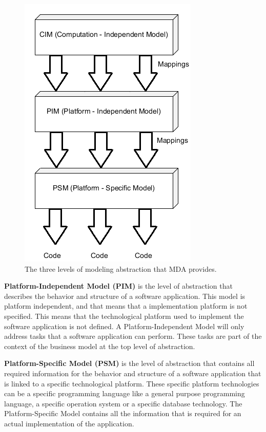 \begin{figure}[H]
	\centering
	\includegraphics[scale=0.7]{./Figures/MDA_Platforms.png}
	\caption[The three levels of modeling abstraction for MDA]
	{The three levels of modeling abstraction that MDA provides.}
	\label{fig:MDA_PLATFORM}
\end{figure}

\textbf{Platform-Independent Model (PIM)} is the level of abstraction that
describes the behavior and structure of a software application. This model is
platform independent, and that means that a implementation platform is not
specified. This means that the technological platform used to implement the
software application is not defined. A Platform-Independent Model will only
address tasks that a software application can perform. These tasks are part of
the context of the business model at the top level of abstraction.

\textbf{Platform-Specific Model (PSM)} is the level of abstraction that contains
all required information for the behavior and structure of a software
application that is linked to a specific technological platform. These specific
platform technologies can be a specific programming language like a general
purpose programming language, a specific operation system or a specific database
technology. The Platform-Specific Model contains all the information that is
required for an actual implementation of the application. 

